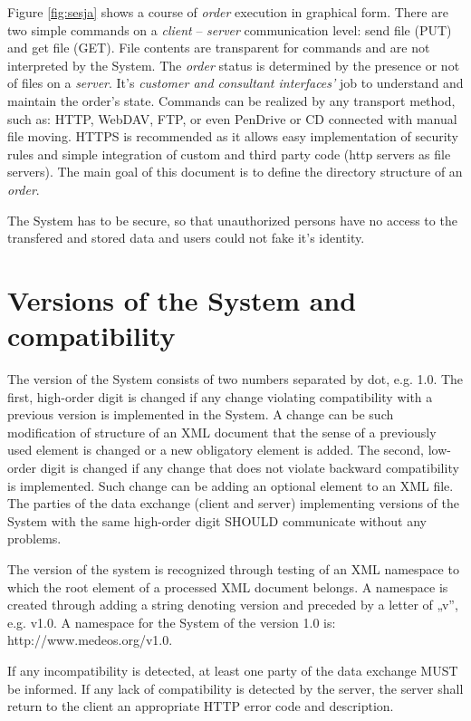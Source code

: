 \documentclass[a4paper]{article}
\begin{document}
Figure \ref{fig:sesja} shows a course of \emph{order} execution in graphical form.
There are two simple commands on a \emph{client} -- \emph{server} communication level:
send file (PUT) and get file (GET). File contents are transparent for commands and are not
interpreted by the System. The \emph{order} status is determined by the presence or
not of files on a \emph{server}. It's \emph{customer and consultant interfaces'} job
to understand and maintain the order's state. Commands can be realized by any transport
method, such as: HTTP, WebDAV, FTP, or even PenDrive or CD connected with manual file
moving. HTTPS is recommended as it allows easy implementation of security rules and simple
integration of custom and third party code (http servers as file servers). The main goal
of this document is to define the directory structure of an \emph{order}.

The System has to be secure, so that unauthorized persons have no access to the
transfered and stored data and users could not fake it's identity. 

\section{Versions of the System and compatibility}
The version of the System consists of two numbers separated by dot, e.g. 1.0. The first, 
high-order digit is changed if any change violating compatibility with a previous version 
is implemented in the System. A change can be such modification of structure of an XML document
that the sense of a previously used element is changed or a new obligatory element is added. 
The second, low-order digit is changed if any change that does not violate backward 
compatibility is implemented. Such change can be adding an optional element to an XML file. 
The parties of the data exchange (client and server) implementing versions of the System with 
the same high-order digit SHOULD communicate without any problems.

The version of the system is recognized through testing of an XML namespace to which the root 
element of a processed XML document belongs. A namespace is created through adding a string 
denoting version and preceded by a letter of „v”, e.g. v1.0. A namespace for the System of 
the version 1.0 is: http://www.medeos.org/v1.0.

If any incompatibility is detected, at least one party of the data exchange MUST be informed. 
If any lack of compatibility is detected by the server, the server shall return to the client 
an appropriate HTTP error code and description.
\end{document}
